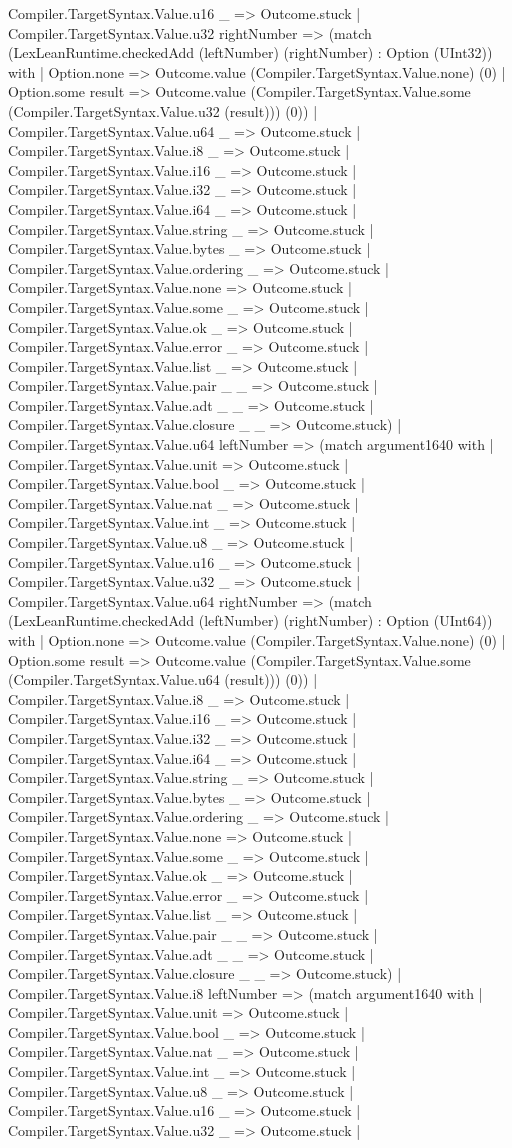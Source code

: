 \documentclass[11pt]{article}
\begin{document}
Compiler.TargetSyntax.Value.u16 \_ => Outcome.stuck | Compiler.TargetSyntax.Value.u32 rightNumber => (match (LexLeanRuntime.checkedAdd (leftNumber) (rightNumber) : Option (UInt32)) with | Option.none => Outcome.value (Compiler.TargetSyntax.Value.none) (0) | Option.some result => Outcome.value (Compiler.TargetSyntax.Value.some (Compiler.TargetSyntax.Value.u32 (result))) (0)) | Compiler.TargetSyntax.Value.u64 \_ => Outcome.stuck | Compiler.TargetSyntax.Value.i8 \_ => Outcome.stuck | Compiler.TargetSyntax.Value.i16 \_ => Outcome.stuck | Compiler.TargetSyntax.Value.i32 \_ => Outcome.stuck | Compiler.TargetSyntax.Value.i64 \_ => Outcome.stuck | Compiler.TargetSyntax.Value.string \_ => Outcome.stuck | Compiler.TargetSyntax.Value.bytes \_ => Outcome.stuck | Compiler.TargetSyntax.Value.ordering \_ => Outcome.stuck | Compiler.TargetSyntax.Value.none => Outcome.stuck | Compiler.TargetSyntax.Value.some \_ => Outcome.stuck | Compiler.TargetSyntax.Value.ok \_ => Outcome.stuck | Compiler.TargetSyntax.Value.error \_ => Outcome.stuck | Compiler.TargetSyntax.Value.list \_ => Outcome.stuck | Compiler.TargetSyntax.Value.pair \_ \_ => Outcome.stuck | Compiler.TargetSyntax.Value.adt \_ \_ => Outcome.stuck | Compiler.TargetSyntax.Value.closure \_ \_ => Outcome.stuck) | Compiler.TargetSyntax.Value.u64 leftNumber => (match argument1640 with | Compiler.TargetSyntax.Value.unit => Outcome.stuck | Compiler.TargetSyntax.Value.bool \_ => Outcome.stuck | Compiler.TargetSyntax.Value.nat \_ => Outcome.stuck | Compiler.TargetSyntax.Value.int \_ => Outcome.stuck | Compiler.TargetSyntax.Value.u8 \_ => Outcome.stuck | Compiler.TargetSyntax.Value.u16 \_ => Outcome.stuck | Compiler.TargetSyntax.Value.u32 \_ => Outcome.stuck | Compiler.TargetSyntax.Value.u64 rightNumber => (match (LexLeanRuntime.checkedAdd (leftNumber) (rightNumber) : Option (UInt64)) with | Option.none => Outcome.value (Compiler.TargetSyntax.Value.none) (0) | Option.some result => Outcome.value (Compiler.TargetSyntax.Value.some (Compiler.TargetSyntax.Value.u64 (result))) (0)) | Compiler.TargetSyntax.Value.i8 \_ => Outcome.stuck | Compiler.TargetSyntax.Value.i16 \_ => Outcome.stuck | Compiler.TargetSyntax.Value.i32 \_ => Outcome.stuck | Compiler.TargetSyntax.Value.i64 \_ => Outcome.stuck | Compiler.TargetSyntax.Value.string \_ => Outcome.stuck | Compiler.TargetSyntax.Value.bytes \_ => Outcome.stuck | Compiler.TargetSyntax.Value.ordering \_ => Outcome.stuck | Compiler.TargetSyntax.Value.none => Outcome.stuck | Compiler.TargetSyntax.Value.some \_ => Outcome.stuck | Compiler.TargetSyntax.Value.ok \_ => Outcome.stuck | Compiler.TargetSyntax.Value.error \_ => Outcome.stuck | Compiler.TargetSyntax.Value.list \_ => Outcome.stuck | Compiler.TargetSyntax.Value.pair \_ \_ => Outcome.stuck | Compiler.TargetSyntax.Value.adt \_ \_ => Outcome.stuck | Compiler.TargetSyntax.Value.closure \_ \_ => Outcome.stuck) | Compiler.TargetSyntax.Value.i8 leftNumber => (match argument1640 with | Compiler.TargetSyntax.Value.unit => Outcome.stuck | Compiler.TargetSyntax.Value.bool \_ => Outcome.stuck | Compiler.TargetSyntax.Value.nat \_ => Outcome.stuck | Compiler.TargetSyntax.Value.int \_ => Outcome.stuck | Compiler.TargetSyntax.Value.u8 \_ => Outcome.stuck | Compiler.TargetSyntax.Value.u16 \_ => Outcome.stuck | Compiler.TargetSyntax.Value.u32 \_ => Outcome.stuck | 
\end{document}
